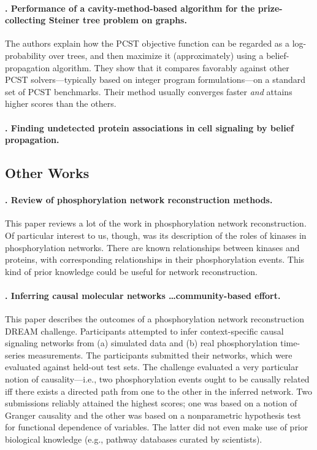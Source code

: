 \documentclass[14pt]{article}
\begin{document}
\paragraph{ \citet{2012-biazzo-steiner}. Performance of a cavity-method-based algorithm for the prize-collecting Steiner tree problem on graphs.}
The authors explain how the PCST objective function can be regarded as a log-probability over trees, and then maximize it (approximately) using a belief-propagation algorithm.
They show that it compares favorably against other PCST solvers---typically based on integer program formulations---on a standard set of PCST benchmarks.
Their method usually converges faster \emph{and} attains higher scores than the others.

\paragraph{ \citet{2011-bailly-bechet-belief}. Finding undetected protein associations in cell signaling by belief propagation.}




\subsection{Other Works}

\paragraph{ \citet{2018-invergo-review}. Review of phosphorylation network reconstruction methods. }
This paper reviews a lot of the work in phosphorylation network reconstruction.
Of particular interest to us, though, was its description of the roles of kinases in phosphorylation networks. 
There are known relationships between kinases and proteins, with corresponding relationships in their phosphorylation events.
This kind of prior knowledge could be useful for network reconstruction.

\paragraph{ \citet{2016-hill-community}. Inferring causal molecular networks \ldots community-based effort.}
This paper describes the outcomes of a phosphorylation network reconstruction DREAM challenge.
Participants attempted to infer context-specific causal signaling networks from (a) simulated data and (b) real phosphorylation time-series measurements.
The participants submitted their networks, which were evaluated against held-out test sets.
The challenge evaluated a very particular notion of causality---i.e., two phosphorylation events ought to be causally related iff there exists a directed path from one to the other in the inferred network.
Two submissions reliably attained the highest scores; one was based on a notion of Granger causality and the other was based on a nonparametric hypothesis test for functional dependence of variables.
The latter did not even make use of prior biological knowledge (e.g., pathway databases curated by scientists).
\end{document}
